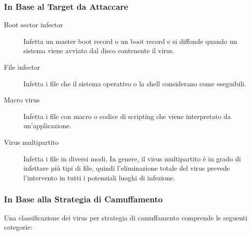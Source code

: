 \subsubsection{In Base al Target da Attaccare}

\begin{description}
    \item[Boot sector infector] Infetta un master boot record o un boot record e si diffonde quando un sistema viene avviato dal disco contenente il virus.
    \item[File infector] Infetta i file che il sistema operativo o la shell considerano come eseguibili.
    \item[Macro virus] Infetta i file con macro o codice di scripting che viene interpretato da un'applicazione.
    \item[Virus multipartito] Infetta i file in diversi modi. In genere, il virus multipartito è in grado di infettare più tipi di file, quindi l'eliminazione totale del virus prevede l'intervento in tutti i potenziali luoghi di infezione.
\end{description}

\subsubsection{In Base alla Strategia di Camuffamento}

Una classificazione dei virus per strategia di camuffamento comprende le seguenti categorie:

